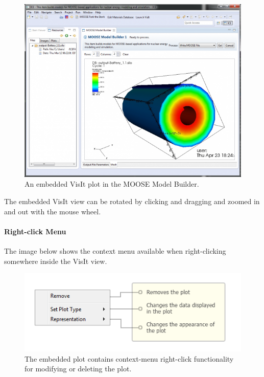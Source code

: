 \begin{figure}[htbp]
\centering
\includegraphics[width=\textwidth]{figures/ICE_Viz_VisIt.png}
\caption{An embedded VisIt plot in the MOOSE Model Builder. }
\end{figure}

The embedded VisIt view can be rotated by clicking and dragging and
zoomed in and out with the mouse wheel.

\paragraph{Right-click Menu}\label{right-click-menu}

The image below shows the context menu available when right-clicking
somewhere inside the VisIt view.

\begin{figure}[htbp]
\centering
\includegraphics[scale=.6]{figures/ICE_Viz_VisIt-ContextMenu.png}
\caption{The embedded plot contains context-menu right-click functionality for modifying or deleting the plot.}
\end{figure}

